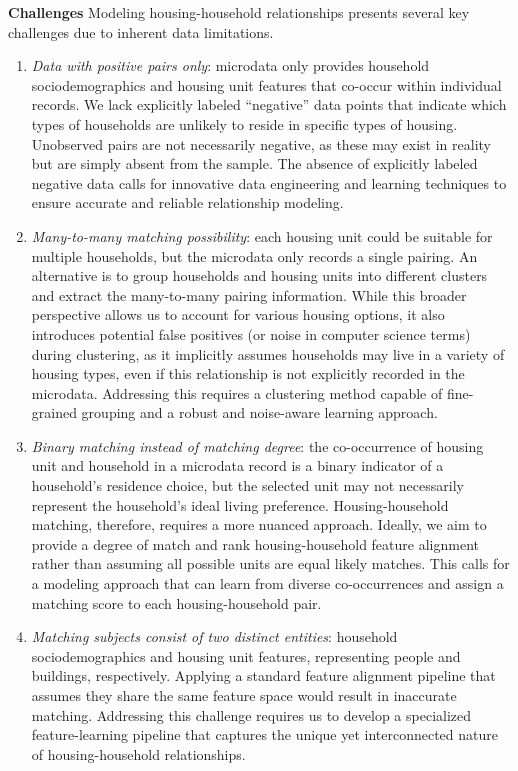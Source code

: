 \documentclass[]{nature_mod}
\begin{document}
\textbf{Challenges} Modeling housing-household relationships presents several key challenges due to inherent data limitations.
\begin{enumerate}
\vspace{-4pt}
    \item \textit{Data with positive pairs only}: microdata only provides household sociodemographics and housing unit features that co-occur within individual records. We lack explicitly labeled “negative” data points that indicate which types of households are unlikely to reside in specific types of housing. Unobserved pairs are not necessarily negative, as these may exist in reality but are simply absent from the sample. The absence of explicitly labeled negative data calls for innovative data engineering and learning techniques to ensure accurate and reliable relationship modeling.  \vspace{-6pt}  
    \item \textit{Many-to-many matching possibility}: each housing unit could be suitable for multiple households, but the microdata only records a single pairing. An alternative is to group households and housing units into different clusters and extract the many-to-many pairing information. While this broader perspective allows us to account for various housing options, it also introduces potential false positives (or noise in computer science terms) during clustering, as it implicitly assumes households may live in a variety of housing types, even if this relationship is not explicitly recorded in the microdata. Addressing this requires a clustering method capable of fine-grained grouping and a robust and noise-aware learning approach. \vspace{-6pt}  
    \item \textit{Binary matching instead of matching degree}: the co-occurrence of housing unit and household in a microdata record is a binary indicator of a household's residence choice, but the selected unit may not necessarily represent the household’s ideal living preference. Housing-household matching, therefore, requires a more nuanced approach. Ideally, we aim to provide a degree of match and rank housing-household feature alignment rather than assuming all possible units are equal likely matches. This calls for a modeling approach that can learn from diverse co-occurrences and assign a matching score to each housing-household pair.  \vspace{-6pt} 
    \item \textit{Matching subjects consist of two distinct entities}: household sociodemographics and housing unit features, representing people and buildings, respectively. Applying a standard feature alignment pipeline that assumes they share the same feature space would result in inaccurate matching. Addressing this challenge requires us to develop a specialized feature-learning pipeline that captures the unique yet interconnected nature of housing-household relationships. \vspace{-6pt}  

\end{enumerate}
\end{document}
